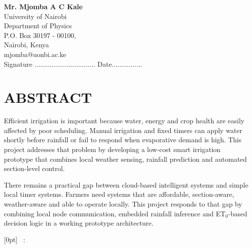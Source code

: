 \documentclass[12pt,a4paper]{report}
\begin{document}
	\noindent \textbf{Mr. Mjomba A C Kale}\\
	University of Nairobi \\
	Department of Physics\\
	P.O. Box 30197 - 00100,\\
	Nairobi, Kenya\\
	mjomba@uonbi.ac.ke\\

Signature ................................ Date................
	\doublespacing

\chapter*{ABSTRACT}
Efficient irrigation is important because water, energy and crop health are easily affected by poor scheduling. Manual irrigation and fixed timers can apply water shortly before rainfall or fail to respond when evaporative demand is high. This project addresses that problem by developing a low-cost smart irrigation prototype that combines local weather sensing, rainfall prediction and automated section-level control.

There remains a practical gap between cloud-based intelligent systems and simple local timer systems. Farmers need systems that are affordable, section-aware, weather-aware and able to operate locally. This project responds to that gap by combining local node communication, embedded rainfall inference and ET$_0$-based decision logic in a working prototype architecture.

\cleardoublepage
{}
[0pt]
{\bfseries}
{\chaptername\ \thecontentslabel:\quad}
{}
{\hfill\contentspage}
\renewcommand{\contentsname}{TABLE OF CONTENTS}
\tableofcontents
{}
\doublespacing

\listoffigures
{}
\cleardoublepage
\listoftables
{}
\newpage
\renewcommand{\nomname}{LIST OF ABBREVIATIONS, ACRONYMS AND SYMBOLS}
\printnomenclature[2.0cm]
\end{document}
